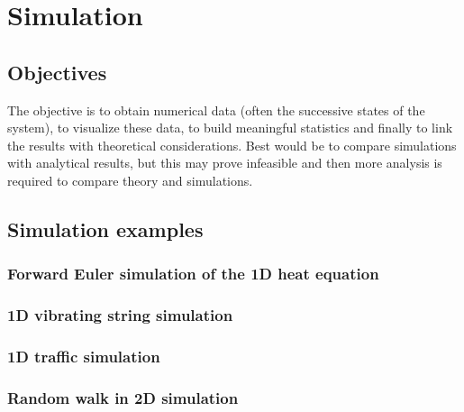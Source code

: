 \thispagestyle{empty}
\chapter{Simulation}
\label{simulation.chap}

\section{Objectives}
The objective is to obtain numerical data (often the successive states of the system), to visualize these data, to build meaningful statistics and finally to link the results with theoretical considerations. Best would be to compare simulations with analytical results, but this may prove infeasible and then more analysis is required to compare theory and simulations.

\section{Simulation examples}
\subsection{Forward Euler simulation of the 1D heat equation}


\subsection{1D vibrating string simulation}


\subsection{1D traffic simulation}


\subsection{Random walk in 2D simulation}
